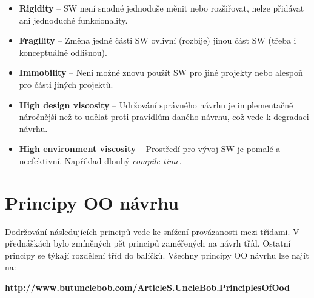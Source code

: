 \documentclass{szzclass}
\begin{document}
\begin{itemize}
      \item \textbf{Rigidity} -- SW není snadné jednoduše měnit nebo rozšiřovat,
      nelze přidávat ani jednoduché funkcionality.
      \item \textbf{Fragility} -- Změna jedné části SW ovlivní (rozbije) jinou
      část SW (třeba i konceptuálně odlišnou).
      \item \textbf{Immobility} -- Není možné znovu použít SW pro jiné projekty
      nebo alespoň pro části jiných projektů.
      \item \textbf{High design viscosity} -- Udržování správného návrhu je implementačně náročnější
      než to udělat proti pravidlům daného návrhu, což vede k degradaci návrhu.
      \item \textbf{High environment viscosity} -- Prostředí pro vývoj SW je pomalé a neefektivní.
      Například dlouhý \textit{compile-time}.
\end{itemize}


\section{Principy OO návrhu}

Dodržování následujících principů vede ke snížení provázanosti mezi třídami.
V přednáškách bylo zmíněných pět principů zaměřených na návrh tříd.
Ostatní principy se týkají rozdělení tříd do balíčků.
Všechny principy OO návrhu lze najít na:

\textbf{http://www.butunclebob.com/ArticleS.UncleBob.PrinciplesOfOod}
\end{document}

